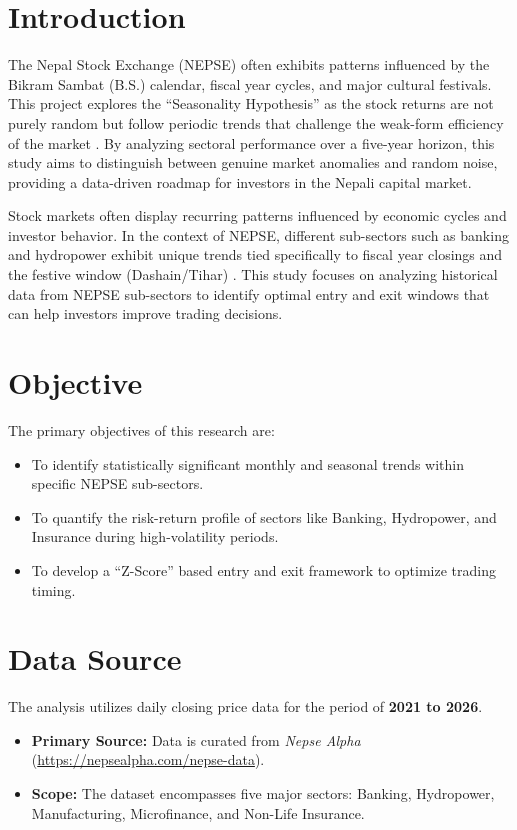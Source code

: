 \documentclass[12pt,a4paper,fleqn]{article}
\begin{document}
\section{Introduction}
The Nepal Stock Exchange (NEPSE) often exhibits patterns influenced by the Bikram Sambat (B.S.) calendar, fiscal year cycles, and major cultural festivals. This project explores the ``Seasonality Hypothesis'' as the stock returns are not purely random but follow periodic trends that challenge the weak-form efficiency of the market \cite{joshi2025}. By analyzing sectoral performance over a five-year horizon, this study aims to distinguish between genuine market anomalies and random noise, providing a data-driven roadmap for investors in the Nepali capital market. 

Stock markets often display recurring patterns influenced by economic cycles and investor behavior. In the context of NEPSE, different sub-sectors such as banking and hydropower exhibit unique trends tied specifically to fiscal year closings and the festive window (Dashain/Tihar) \cite{gurung2024}. This study focuses on analyzing historical data from NEPSE sub-sectors to identify optimal entry and exit windows that can help investors improve trading decisions.

\section{Objective}
The primary objectives of this research are:
\begin{itemize}
    \item To identify statistically significant monthly and seasonal trends within specific NEPSE sub-sectors.
    \item To quantify the risk-return profile of sectors like Banking, Hydropower, and Insurance during high-volatility periods.
    \item To develop a ``Z-Score'' based entry and exit framework to optimize trading timing.
\end{itemize}

\section{Data Source}
The analysis utilizes daily closing price data for the period of \textbf{2021 to 2026}.
\begin{itemize}
    \item \textbf{Primary Source:} Data is curated from \textit{Nepse Alpha} (\url{https://nepsealpha.com/nepse-data}).
    \item \textbf{Scope:} The dataset encompasses five major sectors: Banking, Hydropower, Manufacturing, Microfinance, and Non-Life Insurance.
\end{itemize}
\end{document}
